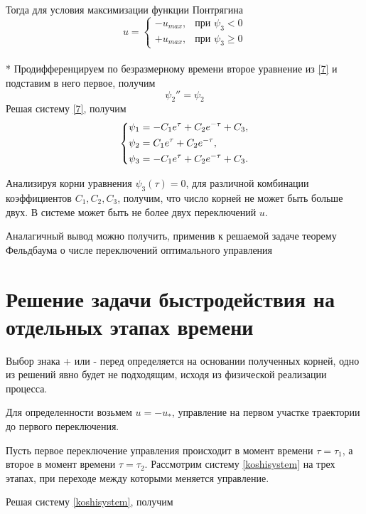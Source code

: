 \documentclass[a4paper,12pt, openany]{book}
\theoremstyle{plain} %
\theoremstyle{definition} %
\theoremstyle{remark} %
\numberwithin{equation}{chapter}
\begin{document}
{Тогда для условия максимизации функции Понтрягина
\[
    u=
    \begin{cases}
        -u_{max}, & \text{при $\psi_3<0$}          \\
        +u_{max}, & \text{при $\psi_3\geqslant 0$}
    \end{cases}
\]\\*
Продифференцируем по безразмерному времени второе уравнение из \eqref{7} и подставим в него первое, получим
\[
    \psi_2 ''=\psi_2
\]
Решая систему \eqref{7}, получим
\[
    \left\{ {\begin{aligned}
                 & \psi_1 = -C_1e^\tau+C_2e^{-\tau}+C_3, \hfill  \\
                 & \psi_2 = C_1e^\tau+C_2e^{-\tau} , \hfill      \\
                 & \psi_3 = -C_1e^\tau+C_2e^{-\tau}+C_3 . \hfill \\
            \end{aligned}} \right.
\]

Анализируя корни уравнения $\psi_3(\tau)=0$, для различной комбинации
коэффициентов $C_1,C_2,C_3$, получим, что число корней не может быть больше двух. В системе может быть не более двух переключений $u$.

Аналагичный вывод можно получить, применив к решаемой задаче теорему Фельдбаума о числе переключений оптимального управления\cite{feldbaum}



\section{Решение задачи быстродействия на отдельных этапах времени}
Выбор знака + или - перед определяется на основании полученных корней,
одно из решений явно будет не подходящим, исходя из физической реализации процесса.

Для определенности возьмем $u=-u_\ast$, управление на первом участке траектории до первого переключения.

Пусть первое переключение управления происходит в момент времени
$\tau=\tau_1$, а второе в момент времени
$\tau=\tau_2$. Рассмотрим систему \eqref{koshisystem} на трех этапах,
при переходе между которыми меняется управление.

Решая систему \eqref{koshisystem}, получим

}
\end{document}
